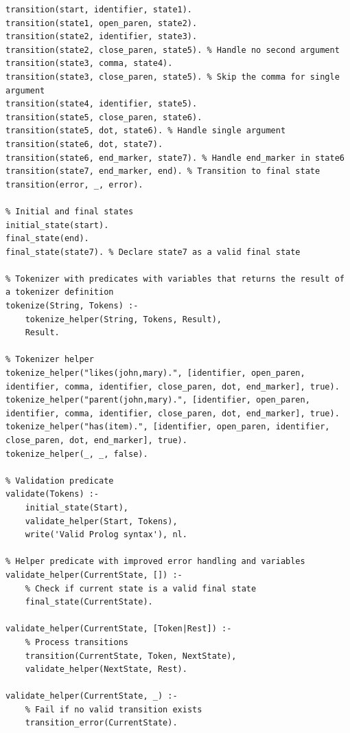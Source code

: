 \documentclass{article}
\begin{document}
\lstset{
    language=Prolog,
    basicstyle=\ttfamily\footnotesize,
    numbers=left,
    numberstyle=\tiny,
    numbersep=5pt,
    frame=single,
    breaklines=true,
    captionpos=b
}

\begin{lstlisting}[caption=validator.pl]
% FSM transitions
transition(start, identifier, state1).
transition(state1, open_paren, state2).
transition(state2, identifier, state3).
transition(state2, close_paren, state5). % Handle no second argument
transition(state3, comma, state4).
transition(state3, close_paren, state5). % Skip the comma for single argument
transition(state4, identifier, state5).
transition(state5, close_paren, state6).
transition(state5, dot, state6). % Handle single argument
transition(state6, dot, state7).
transition(state6, end_marker, state7). % Handle end_marker in state6
transition(state7, end_marker, end). % Transition to final state
transition(error, _, error).

% Initial and final states
initial_state(start).
final_state(end).
final_state(state7). % Declare state7 as a valid final state

% Tokenizer with predicates with variables that returns the result of a tokenizer definition
tokenize(String, Tokens) :-
    tokenize_helper(String, Tokens, Result),
    Result.

% Tokenizer helper
tokenize_helper("likes(john,mary).", [identifier, open_paren, identifier, comma, identifier, close_paren, dot, end_marker], true).
tokenize_helper("parent(john,mary).", [identifier, open_paren, identifier, comma, identifier, close_paren, dot, end_marker], true).
tokenize_helper("has(item).", [identifier, open_paren, identifier, close_paren, dot, end_marker], true).
tokenize_helper(_, _, false).

% Validation predicate
validate(Tokens) :-
    initial_state(Start),
    validate_helper(Start, Tokens),
    write('Valid Prolog syntax'), nl.

% Helper predicate with improved error handling and variables
validate_helper(CurrentState, []) :-
    % Check if current state is a valid final state
    final_state(CurrentState).

validate_helper(CurrentState, [Token|Rest]) :-
    % Process transitions
    transition(CurrentState, Token, NextState),
    validate_helper(NextState, Rest).

validate_helper(CurrentState, _) :-
    % Fail if no valid transition exists
    transition_error(CurrentState).


\end{lstlisting}
\end{document}
